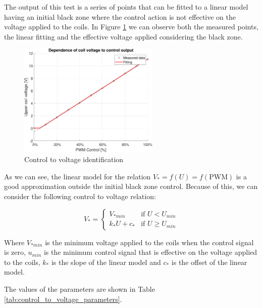 The output of this test is a series of points that can be fitted to a linear model having an initial black zone where the control action is not effective on the voltage applied to the coils.
In Figure \ref{fig:control_to_voltage} we can observe both the measured points, the linear fitting and the effective voltage applied considering the black zone.

\begin{figure}[H]
    \centering
    \includegraphics[width=0.6\textwidth]{img/MATLAB/identification/control_to_voltage.pdf}
    \caption{Control to voltage identification}
    \label{fig:control_to_voltage}
\end{figure}

As we can see, the linear model for the relation $V_* = f(U) = f(\text{PWM})$ is a good approximation outside the initial black zone control.
Because of this, we can consider the following control to voltage relation:

\begin{equation}
    V_* = \begin{cases}
        V_{*min}    & \text{if } U < U_{min}    \\
        k_* U + c_* & \text{if } U \geq U_{min}
    \end{cases}
\end{equation}

Where $V_{*min}$ is the minimum voltage applied to the coils when the control signal is zero, $u_{min}$ is the minimum control signal that is effective on the voltage applied to the coils, $k_*$ is the slope of the linear model and $c_*$ is the offset of the linear model.

The values of the parameters are shown in Table \ref{tab:control_to_voltage_parameters}.

